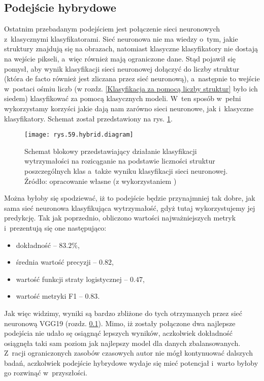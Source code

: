 \subsection{Podejście hybrydowe}
\label{binary.ann.with.structures}

Ostatnim przebadanym podejściem jest połączenie sieci neuronowych z~klasycznymi klasyfikatorami. Sieć neuronowa nie ma wiedzy o~tym, jakie struktury znajdują się na obrazach, natomiast klasyczne klasyfikatory nie dostają na wejście pikseli, a~więc również mają ograniczone dane. Stąd pojawił się pomysł, aby wynik klasyfikacji sieci neuronowej dołączyć do liczby struktur (która de facto również jest zliczana przez sieć neuronową), a~następnie to wejście w~postaci ośmiu liczb (w rozdz. \ref{Klasyfikacja za pomocą liczby struktur} było ich siedem) klasyfikować za pomocą klasycznych modeli. W~ten sposób w~pełni wykorzystamy korzyści jakie dają nam zarówno sieci neuronowe, jak i~klasyczne klasyfikatory. Schemat został przedstawiony na rys. \ref{rys.59.hybrid.diagram}. 
\begin{figure}[!h]
    \centering
    \texttt{[image: rys.59.hybrid.diagram]}
    \caption{Schemat blokowy przedstawiający działanie klasyfikacji wytrzymałości na rozicąganie na podstawie liczności struktur poszczególnych klas a~także wyniku klasyfikacji sieci neuronowej. Źródło: opracowanie własne (z wykorzystaniem )}
    \label{rys.59.hybrid.diagram}
\end{figure}
Można byłoby się spodziewać, iż to podejście będzie przynajmniej tak dobre, jak sama sieć neuronowa klasyfikująca wytrzymałość, gdyż tutaj wykorzystujemy jej predykcję. Tak jak poprzednio, obliczono wartości najważniejszych metryk i~prezentują się one następująco:
\begin{itemize}
	\item dokładność – $83.2\%$,
	\item średnia wartość precyzji – $0.82$,
	\item wartość funkcji straty logistycznej – $0.47$,
	\item wartość metryki F1 – $0.83$.
\end{itemize}
Jak więc widzimy, wyniki są bardzo zbliżone do tych otrzymanych przez sieć neuronową VGG19 (rozdz. \ref{binary.ann.with.structures}). Mimo, iż zostały połączone dwa najlepsze podejścia nie udało sę osiągnąć lepszych wyników, aczkolwiek dokładność osiągnęła taki sam poziom jak najlepszy model dla danych zbalansowanych. Z~racji ograniczonych zasobów czasowych autor nie mógł kontynuować dalszych badań, aczkolwiek podejście hybrydowe wydaje się mieć potencjał i~warto byłoby go rozwinąć w~przyszłości.
